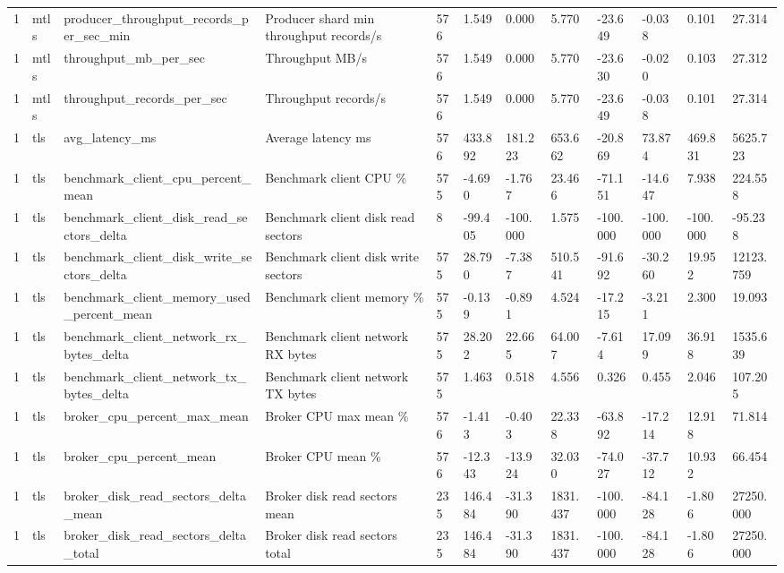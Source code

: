 \begin{longtable}{llllllllllll}
1 & mtls & producer\_throughput\_records\_per\_sec\_min & Producer shard min throughput records/s & 576 & 1.549 & 0.000 & 5.770 & -23.649 & -0.038 & 0.101 & 27.314 \\
1 & mtls & throughput\_mb\_per\_sec & Throughput MB/s & 576 & 1.549 & 0.000 & 5.770 & -23.630 & -0.020 & 0.103 & 27.312 \\
1 & mtls & throughput\_records\_per\_sec & Throughput records/s & 576 & 1.549 & 0.000 & 5.770 & -23.649 & -0.038 & 0.101 & 27.314 \\
1 & tls & avg\_latency\_ms & Average latency ms & 576 & 433.892 & 181.223 & 653.662 & -20.869 & 73.874 & 469.831 & 5625.723 \\
1 & tls & benchmark\_client\_cpu\_percent\_mean & Benchmark client CPU \% & 575 & -4.690 & -1.767 & 23.466 & -71.151 & -14.647 & 7.938 & 224.558 \\
1 & tls & benchmark\_client\_disk\_read\_sectors\_delta & Benchmark client disk read sectors & 8 & -99.405 & -100.000 & 1.575 & -100.000 & -100.000 & -100.000 & -95.238 \\
1 & tls & benchmark\_client\_disk\_write\_sectors\_delta & Benchmark client disk write sectors & 575 & 28.790 & -7.387 & 510.541 & -91.692 & -30.260 & 19.952 & 12123.759 \\
1 & tls & benchmark\_client\_memory\_used\_percent\_mean & Benchmark client memory \% & 575 & -0.139 & -0.891 & 4.524 & -17.215 & -3.211 & 2.300 & 19.093 \\
1 & tls & benchmark\_client\_network\_rx\_bytes\_delta & Benchmark client network RX bytes & 575 & 28.202 & 22.665 & 64.007 & -7.614 & 17.099 & 36.918 & 1535.639 \\
1 & tls & benchmark\_client\_network\_tx\_bytes\_delta & Benchmark client network TX bytes & 575 & 1.463 & 0.518 & 4.556 & 0.326 & 0.455 & 2.046 & 107.205 \\
1 & tls & broker\_cpu\_percent\_max\_mean & Broker CPU max mean \% & 576 & -1.413 & -0.403 & 22.338 & -63.892 & -17.214 & 12.918 & 71.814 \\
1 & tls & broker\_cpu\_percent\_mean & Broker CPU mean \% & 576 & -12.343 & -13.924 & 32.030 & -74.027 & -37.712 & 10.932 & 66.454 \\
1 & tls & broker\_disk\_read\_sectors\_delta\_mean & Broker disk read sectors mean & 235 & 146.484 & -31.390 & 1831.437 & -100.000 & -84.128 & -1.806 & 27250.000 \\
1 & tls & broker\_disk\_read\_sectors\_delta\_total & Broker disk read sectors total & 235 & 146.484 & -31.390 & 1831.437 & -100.000 & -84.128 & -1.806 & 27250.000 \\

\end{longtable}
